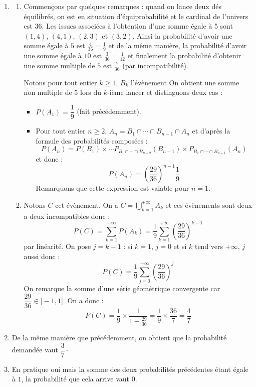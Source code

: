 \documentclass[a4paper,10pt]{report}
\begin{document}
\corr \begin{enumerate}
\item 
\begin{enumerate}
\item Commençons par quelques remarques : quand on lance deux dés équilibrés, on est en situation d'équiprobabilité et le cardinal de l'univers est $36$. Les issues associées à l'obtention d'une somme égale à 5 sont $(1,4)$, $(4,1)$, $(2,3)$ et $(3,2)$. Ainsi la probabilité d'avoir une somme égale à $5$ est $\frac{4}{36} = \frac{1}{9}$ et de la même manière, la probabilité d'avoir une somme égale à $10$ est $\frac{3}{36} = \frac{1}{12}$ et finalement la probabilité d'obtenir une somme multiple de $5$ est $\frac{7}{36}$ (par incompatibilité).

\medskip

\noindent Notons pour tout entier $k \geq 1$, $B_k$ l'évènement \og On obtient une somme non multiple de $5$ lors du $k$-ième lancer \fg et distinguons deux cas :

\begin{itemize}
\item$P(A_1)= \dfrac{1}{9}$ (fait précédemment).
\item Pour tout entier $n \geq 2$, $A_n = B_1 \cap \cdots \cap B_{n-1} \cap A_n$ et d'après la formule des probabilités composées :
$$ P(A_n) = P(B_1) \times \cdots P_{B_1 \cap \cdots \cap B_{n-2}}(B_{n-1}) \times P_{B_1 \cap \cdots \cap B_{n-1}}(A_n)$$
et donc :
$$ \boxed{P(A_n) = \left( \frac{29}{36} \right)^{n-1}  \frac{1}{9}}$$
Remarquons que cette expression est valable pour $n=1$.
\end{itemize}
\item Notons $C$ cet évènement. On a $C = \bigcup_{k=1}^{+ \infty} A_k$ et ces évènements sont deux a deux incompatibles donc :
$$ P(C) = \sum_{k=1}^{+\infty} P(A_k)  = \frac{1}{9} \sum_{k=1}^{+\infty} \left( \frac{29}{36} \right)^{k-1} $$
par linéarité. On pose $j=k-1$ : si $k=1$, $j=0$ et si $k$ tend vers $+ \infty$, $j$ aussi donc :
$$ P(C) = \frac{1}{9}  \sum_{j=0}^{+\infty} \left( \frac{29}{36} \right)^{j}$$
On remarque la somme d'une série géométrique convergente car $\dfrac{29}{36} \in ]-1,1[$. On a donc :
$$P(C) = \frac{1}{9} \times \frac{1}{1-\frac{29}{36}} = \frac{1}{9} \times \frac{36}{7} = \frac{4}{7}$$
\end{enumerate}
\item De la même manière que précédemment, on obtient que la probabilité demandée vaut $\dfrac{3}{7}\cdot$
\item En pratique oui mais la somme des deux probabilités précédentes étant égale à $1$, la probabilité que cela arrive vaut $0$.
\end{enumerate}
\end{document}
